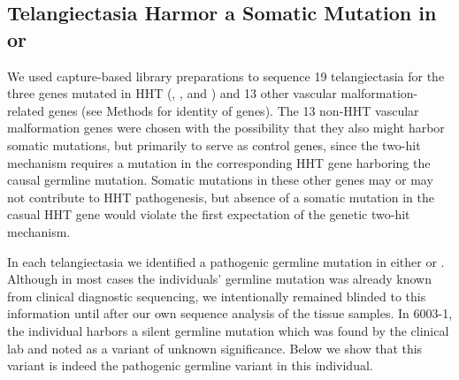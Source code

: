 \subsection{Telangiectasia Harmor a Somatic Mutation in  or }
We used capture-based library preparations to sequence 19 telangiectasia for the three genes mutated in HHT (, , and ) and 13 other vascular malformation-related genes (see Methods for identity of genes). The 13 non-HHT vascular malformation genes were chosen with the possibility that they also might harbor somatic mutations, but primarily to serve as control genes, since the two-hit mechanism requires a mutation in the corresponding HHT gene harboring the causal germline mutation.  Somatic mutations in these other genes may or may not contribute to HHT pathogenesis, but absence of a somatic mutation in the casual HHT gene would violate the first expectation of the genetic two-hit mechanism.

In each telangiectasia we identified a pathogenic germline mutation in either  or .   Although in most cases the individuals’ germline mutation was already known from clinical diagnostic sequencing, we intentionally remained blinded to this information until after our own sequence analysis of the tissue samples.  In 6003-1, the individual harbors a silent germline mutation which was found by the clinical lab and noted as a variant of unknown significance.  Below we show that this variant is indeed the pathogenic germline variant in this individual.

